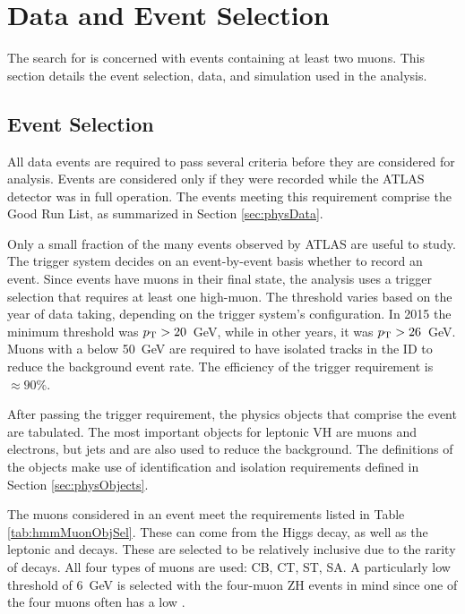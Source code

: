 \section{Data and Event Selection}\label{sec:hmmEvSel}

The search for \hmm is concerned with events containing at least two muons.
This section details the event selection, data, and simulation used in the analysis.

\subsection{Event Selection}\label{sec:hmmEv}

All data events are required to pass several criteria before they are considered for analysis.
Events are considered only if they were recorded while the ATLAS detector was in full operation.
The events meeting this requirement comprise the Good Run List, as summarized in Section \ref{sec:physData}.

Only a small fraction of the many events observed by ATLAS are useful to study. 
The trigger system decides on an event-by-event basis whether to record an event. 
Since \hmm events have muons in their final state, the analysis uses a trigger selection that requires at least one high-\pt muon.
The \pt threshold varies based on the year of data taking, depending on the trigger system's configuration.
In 2015 the minimum threshold was $p_\text{T}>20$~GeV, while in other years, it was $p_\text{T}>26$~GeV.
Muons with a \pt below 50~GeV are required to have isolated tracks in the ID to reduce the background event rate.
The efficiency of the trigger requirement is $\approx90\%$.

After passing the trigger requirement, the physics objects that comprise the event are tabulated.
The most important objects for leptonic VH \hmm are muons and electrons, but jets and \met are also used to reduce the background.
The definitions of the objects make use of identification and isolation requirements defined in Section \ref{sec:physObjects}.

The muons considered in an event meet the requirements listed in Table \ref{tab:hmmMuonObjSel}.
These can come from the Higgs decay, as well as the leptonic \W and \Z decays.
These are selected to be relatively inclusive due to the rarity of \hmm decays.
All four types of muons are used: CB, CT, ST, SA.
A particularly low \pt threshold of 6~GeV is selected with the four-muon ZH events in mind since one of the four muons often has a low \pt.

